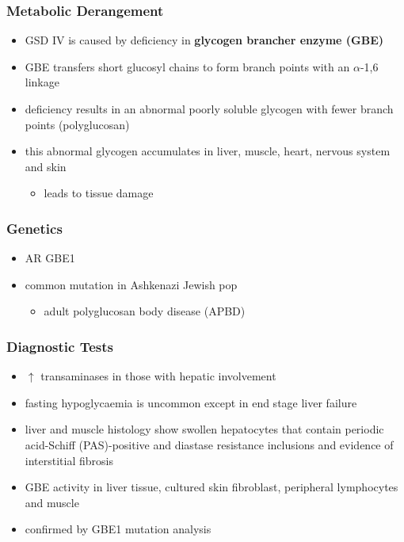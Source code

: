 \documentclass{scrartcl}
\begin{document}
\subsubsection{Metabolic Derangement}
\label{sec:org08f0f4c}
\begin{itemize}
\item GSD IV is caused by deficiency in \textbf{glycogen brancher enzyme (GBE)}
\item GBE transfers short glucosyl chains to form branch points with an
\(\alpha\)-1,6 linkage
\item deficiency results in an abnormal poorly soluble glycogen with fewer branch points (polyglucosan)
\item this abnormal glycogen accumulates in liver, muscle, heart, nervous system and skin
\begin{itemize}
\item leads to tissue damage
\end{itemize}
\end{itemize}

\subsubsection{Genetics}
\label{sec:org1a0358e}
\begin{itemize}
\item AR GBE1
\item common mutation in Ashkenazi Jewish pop
\begin{itemize}
\item adult polyglucosan body disease (APBD)
\end{itemize}
\end{itemize}

\subsubsection{Diagnostic Tests}
\label{sec:org5278b82}

\begin{itemize}
\item \(\uparrow\) transaminases in those with hepatic involvement
\item fasting hypoglycaemia is uncommon except in end stage liver failure
\item liver and muscle histology show swollen hepatocytes that contain
periodic acid-Schiff (PAS)-positive and diastase resistance
inclusions and evidence of interstitial fibrosis
\item GBE activity in liver tissue, cultured skin fibroblast, peripheral
lymphocytes and muscle
\item confirmed by GBE1 mutation analysis
\end{itemize}
\end{document}
